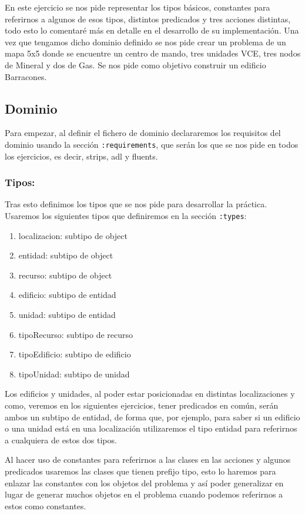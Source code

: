 \documentclass[11pt, spanish]{article}
\begin{document}
En este ejercicio se nos pide representar los tipos básicos, constantes para referirnos a algunos de esos tipos, distintos predicados y tres acciones distintas, todo esto lo comentaré más en detalle en el desarrollo de su implementación. Una vez que tengamos dicho dominio definido se nos pide crear un problema de un mapa 5x5 donde se encuentre un centro de mando, tres unidades VCE, tres nodos de Mineral y dos de Gas. Se nos pide como objetivo construir un edificio Barracones.


\subsection{Dominio}

Para empezar, al definir el fichero de dominio declararemos los requisitos del dominio usando la sección \texttt{:requirements}, que serán los que se nos pide en todos los ejercicios, es decir, strips, adl y fluents.

\subsubsection{Tipos:}

Tras esto definimos los tipos que se nos pide para desarrollar la práctica. Usaremos los siguientes tipos que definiremos en la sección \texttt{:types}:

\begin{enumerate}
	\item localizacion: subtipo de object
	\item entidad: subtipo de object
	\item recurso: subtipo de object
	\item edificio: subtipo de entidad
	\item unidad: subtipo de entidad
	\item tipoRecurso: subtipo de recurso
	\item tipoEdificio: subtipo de edificio
	\item tipoUnidad: subtipo de unidad
\end{enumerate}

Los edificios y unidades, al poder estar posicionadas en distintas localizaciones y como, veremos en los siguientes ejercicios, tener predicados en común, serán ambos un subtipo de entidad, de forma que, por ejemplo, para saber si un edificio o una unidad está en una localización utilizaremos el tipo entidad para referirnos a cualquiera de estos dos tipos.

Al hacer uso de constantes para referirnos a las clases en las acciones y algunos predicados usaremos las clases que tienen prefijo tipo, esto lo haremos para enlazar las constantes con los objetos del problema y así poder generalizar en lugar de generar muchos objetos en el problema cuando podemos referirnos a estos como constantes.
\end{document}
